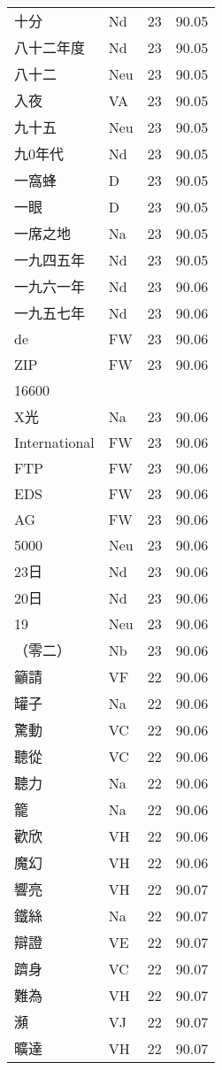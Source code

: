 \documentclass[twocolumn]{book}
\begin{document}
\begin{supertabular}{llrr}
十分 & Nd & 23 &  90.05\\
八十二年度 & Nd & 23 &  90.05\\
八十二 & Neu & 23 &  90.05\\
入夜 & VA & 23 &  90.05\\
九十五 & Neu & 23 &  90.05\\
九0年代 & Nd & 23 &  90.05\\
一窩蜂 & D & 23 &  90.05\\
一眼 & D & 23 &  90.05\\
一席之地 & Na & 23 &  90.05\\
一九四五年 & Nd & 23 &  90.05\\
一九六一年 & Nd & 23 &  90.06\\
一九五七年 & Nd & 23 &  90.06\\
de & FW & 23 &  90.06\\
ZIP & FW & 23 &  90.06\\
16600\\
X光 & Na & 23 &  90.06\\
International & FW & 23 &  90.06\\
FTP & FW & 23 &  90.06\\
EDS & FW & 23 &  90.06\\
AG & FW & 23 &  90.06\\
5000 & Neu & 23 &  90.06\\
23日 & Nd & 23 &  90.06\\
20日 & Nd & 23 &  90.06\\
19 & Neu & 23 &  90.06\\
（零二） & Nb & 23 &  90.06\\
籲請 & VF & 22 &  90.06\\
罐子 & Na & 22 &  90.06\\
驚動 & VC & 22 &  90.06\\
聽從 & VC & 22 &  90.06\\
聽力 & Na & 22 &  90.06\\
籠 & Na & 22 &  90.06\\
歡欣 & VH & 22 &  90.06\\
魔幻 & VH & 22 &  90.06\\
響亮 & VH & 22 &  90.07\\
鐵絲 & Na & 22 &  90.07\\
辯證 & VE & 22 &  90.07\\
躋身 & VC & 22 &  90.07\\
難為 & VH & 22 &  90.07\\
瀕 & VJ & 22 &  90.07\\
曠達 & VH & 22 &  90.07\\

\end{supertabular}
\end{document}
